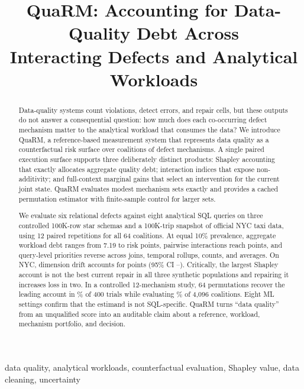 \documentclass[conference]{IEEEtran}
\title{QuaRM: Accounting for Data-Quality Debt Across\\
Interacting Defects and Analytical Workloads}
\author{\IEEEauthorblockN{\TODO{AUTHOR NAMES REQUIRED---SINGLE-BLIND SUBMISSION}}
\IEEEauthorblockA{\TODO{Affiliations, emails, and ORCIDs required before submission}}}
\newcommand{\method}{QuaRM}
\begin{document}
\maketitle

\begin{abstract}
Data-quality systems count violations, detect errors, and repair cells, but these outputs do not answer a consequential question: how much does each co-occurring defect mechanism matter to the analytical workload that consumes the data? We introduce \method, a reference-based measurement system that represents data quality as a counterfactual risk surface over coalitions of defect mechanisms. A single paired execution surface supports three deliberately distinct products: Shapley accounting that exactly allocates aggregate quality debt; interaction indices that expose non-additivity; and full-context marginal gains that select an intervention for the current joint state. \method{} evaluates modest mechanism sets exactly and provides a cached permutation estimator with finite-sample control for larger sets.

We evaluate six relational defects against eight analytical SQL queries on three controlled 100K-row star schemas and a 100K-trip snapshot of official NYC taxi data, using 12 paired repetitions for all 64 coalitions. At equal 10\% prevalence, aggregate workload debt ranges from 7.19 to \NYCRisk{} risk points, pairwise interactions reach \MaxRelInteraction{} points, and query-level priorities reverse across joins, temporal rollups, counts, and averages. On NYC, dimension drift accounts for \NYCDimensionDebt{} points (95\% CI \NYCDimensionLow--\NYCDimensionHigh). Critically, the largest Shapley account is not the best current repair in all three synthetic populations and repairing it increases loss in two. In a controlled 12-mechanism study, 64 permutations recover the leading account in \SamplingTopSixtyFour\% of 400 trials while evaluating \SamplingSurfaceSixtyFour\% of 4,096 coalitions. Eight ML settings confirm that the estimand is not SQL-specific. \method{} turns ``data quality'' from an unqualified score into an auditable claim about a reference, workload, mechanism portfolio, and decision.
\end{abstract}

\begin{IEEEkeywords}
data quality, analytical workloads, counterfactual evaluation, Shapley value, data cleaning, uncertainty
\end{IEEEkeywords}
\end{document}
